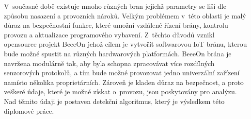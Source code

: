  V~současné době existuje mnoho různých bran jejichž parametry se liší dle 
 způsobu nasazení a provozních nároků. Velkým problémem v~této oblasti je malý 
 důraz na bezpečnostní funkce, které umožní vzdálené řízení brány, kontrolu provozu a 
 aktualizace programového vybavení. Z~těchto důvodů vznikl opensource projekt BeeeOn \cite{beeeon}
 jehož cílem je vytvořit softwarovou IoT bránu, kterou bude možné spustit na různých 
 hardwarových platformách. BeeeOn brána je navržena modulárně tak, aby byla schopna 
 zpracovávat více rozdílných senzorových protokolů, a tím bude možné provozovat jedno
 univerzální zařízení namísto několika proprietárních. Zároveň je kladen důraz na bezpečnost, 
 a proto veškeré údaje, které je možné získat o~provozu, jsou poskytovány pro analýzu. Nad těmito údaji
 je postaven detekční algoritmus, který je výsledkem této diplomové práce.
 


